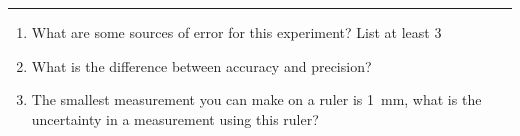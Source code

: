 \documentclass[11pt]{article}
\begin{document}
\Large

\medskip\hrule\bigskip\bigskip
{}
\begin{enumerate}

\item What are some sources of error for this experiment? List at least 3
  \vspace*{0.27\textheight}
\item What is the difference between accuracy and precision?
  \vspace*{0.27\textheight}
\item The smallest measurement you can make on a ruler is \SI{1}{\mm}, what is the uncertainty in a measurement using this ruler?
  
\end{enumerate}
\end{document}
